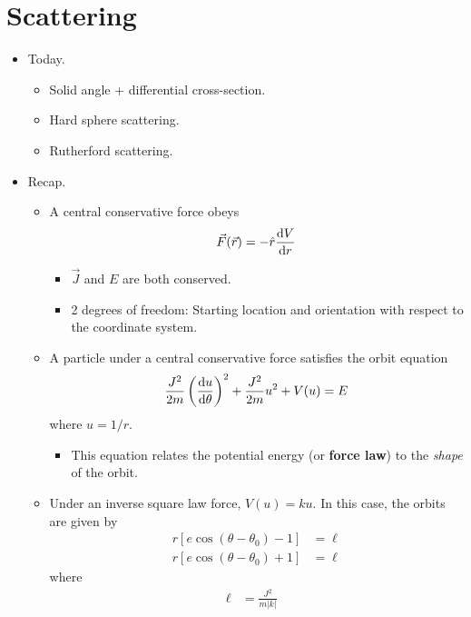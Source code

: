 \documentclass[../notes.tex]{subfiles}
\begin{document}
\section{Scattering}
\begin{itemize}
    \item {}Today.
    \begin{itemize}
        \item Solid angle + differential cross-section.
        \item Hard sphere scattering.
        \item Rutherford scattering.
    \end{itemize}
    \item Recap.
    \begin{itemize}
        \item A central conservative force obeys
        \begin{equation*}
            \vec{F}(\vec{r}) = -\hat{r}\dv{V}{r}
        \end{equation*}
        \begin{itemize}
            \item $\vec{J}$ and $E$ are both conserved.
            \item 2 degrees of freedom: Starting location and orientation with respect to the coordinate system.
        \end{itemize}
        \item A particle under a central conservative force satisfies the orbit equation
        \begin{equation*}
            \frac{J^2}{2m}\left( \dv{u}{\theta} \right)^2+\frac{J^2}{2m}u^2+V(u) = E
        \end{equation*}
        where $u=1/r$.
        \begin{itemize}
            \item This equation relates the potential energy (or \textbf{force law}) to the \emph{shape} of the orbit.
        \end{itemize}
        \item Under an inverse square law force, $V(u)=ku$. In this case, the orbits are given by
        \begin{align*}
            r[e\cos(\theta-\theta_0)-1] &= \ell\tag{$k>0$}\\
            r[e\cos(\theta-\theta_0)+1] &= \ell\tag{$k<0$}
        \end{align*}
        where
        \begin{align*}
            \ell &= \frac{J^2}{m|k|}&

\end{align*}
\end{itemize}
\end{itemize}
\end{document}
